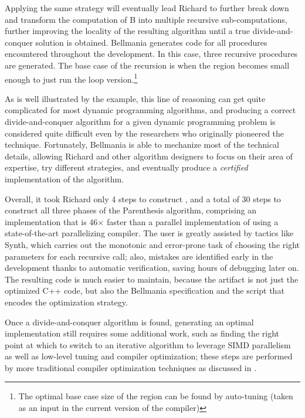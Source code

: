 Applying the same strategy will eventually lead Richard to further
break down and transform the computation of B into multiple recursive
sub-computations, %
further improving the locality of the resulting algorithm until
a true divide-and-conquer solution is obtained.
Bellmania generates code for
all procedures encountered throughout the development. In this case, three recursive procedures
are generated. The base case of the recursion is when the region
becomes small enough to just run the loop version.\footnote{The optimal  base case size of the region can be found by auto-tuning (taken as an input in the current version of the compiler)}

As is well illustrated by the example, this line of reasoning can get quite complicated for most dynamic programming algorithms, 
and producing a correct divide-and-conquer algorithm for a given dynamic programming problem is considered quite difficult even by the researchers who originally pioneered the technique. 
Fortunately, Bellmania is able to mechanize most of the technical details,
allowing Richard and other algorithm designers to focus on their area of expertise,
try different strategies,
and eventually produce a \emph{certified} implementation of the algorithm.

Overall, it took Richard only 4 steps to construct ,
and a total of 30 steps to construct all three phases of the Parenthesis algorithm,
comprising an implementation that is 46$\times$ faster than a parallel implementation of
 using a state-of-the-art parallelizing compiler.
The user is greatly assisted by tactics like {\sf Synth}, which carries out the monotonic
and error-prone task of choosing the right parameters for each recursive call; also,
mistakes are identified early in the development thanks to automatic verification,
saving hours of debugging later on.
The resulting code is much easier to maintain, because the artifact is not just
the optimized C++ code, but also the Bellmania specification and the script
that encodes the optimization strategy.

Once a divide-and-conquer algorithm is found, generating an optimal implementation still requires some additional work, such as finding the right point at which to switch to an iterative algorithm to leverage SIMD parallelism as well as low-level tuning and compiler optimization;
these steps are performed by more traditional compiler optimization techniques
as discussed in .


